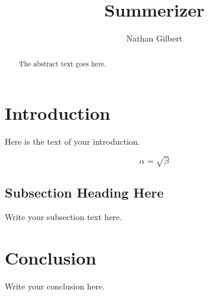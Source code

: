 \documentclass{article}
\begin{document}
\title{Summerizer}
\author{Nathan Gilbert}

\maketitle

\begin{abstract}
The abstract text goes here.
\end{abstract}

\section{Introduction}
Here is the text of your introduction.

\begin{equation}
    \label{simple_equation}
    \alpha = \sqrt{\beta}
\end{equation}

\subsection{Subsection Heading Here}
Write your subsection text here.

\section{Conclusion}
Write your conclusion here.
\end{document}
